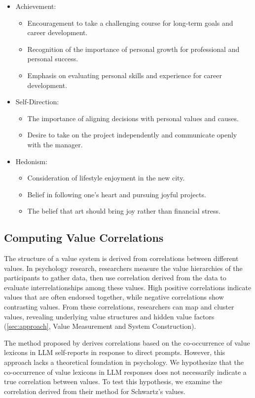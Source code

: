 \begin{itemize}[leftmargin=2em]
    \item Achievement:
    \begin{itemize}
        \item Encouragement to take a challenging course for long-term goals and career development.
        \item Recognition of the importance of personal growth for professional and personal success.
        \item Emphasis on evaluating personal skills and experience for career development.
    \end{itemize}
    \item Self-Direction:
    \begin{itemize}
        \item The importance of aligning decisions with personal values and causes.
        \item Desire to take on the project independently and communicate openly with the manager.
    \end{itemize}
    \item Hedonism:
    \begin{itemize}
        \item Consideration of lifestyle enjoyment in the new city.
        \item Belief in following one's heart and pursuing joyful projects.
        \item The belief that art should bring joy rather than financial stress.
    \end{itemize}
\end{itemize}

\subsection{Computing Value Correlations}
The structure of a value system is derived from correlations between different values. In psychology research, researchers measure the value hierarchies of the participants to gather data, then use correlation derived from the data to evaluate interrelationships among these values. High positive correlations indicate values that are often endorsed together, while negative correlations show contrasting values. From these correlations, researchers can map and cluster values, revealing underlying value structures and hidden value factors (\cref{sec:approach}, Value Measurement and System Construction).

The method proposed by \citet{biedma2024beyond} derives correlations based on the co-occurrence of value lexicons in LLM self-reports in response to direct prompts. However, this approach lacks a theoretical foundation in psychology. We hypothesize that the co-occurrence of value lexicons in LLM responses does not necessarily indicate a true correlation between values. To test this hypothesis, we examine the correlation derived from their method for Schwartz's values.

